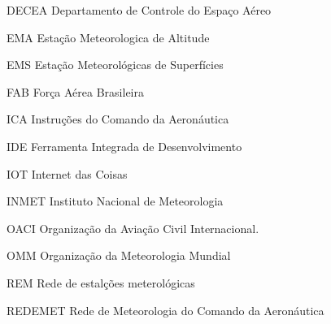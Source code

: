 \begin{siglas}
  \item[DECEA] Departamento de Controle do Espaço Aéreo
  \item[EMA] Estação Meteorologica de Altitude
  \item[EMS] Estação Meteorológicas de Superfícies
  \item[FAB] Força Aérea Brasileira
  \item[ICA] Instruções do Comando da Aeronáutica
  \item[IDE] Ferramenta Integrada de Desenvolvimento
  \item[IOT] Internet das Coisas
  \item[INMET] Instituto Nacional de Meteorologia
  \item[OACI] Organização da Aviação Civil Internacional.
  \item[OMM] Organização da Meteorologia Mundial
  \item[REM] Rede de estalções meterológicas
  \item[REDEMET] Rede de Meteorologia do Comando da Aeronáutica
  
  
  

 
  
  
\end{siglas}
